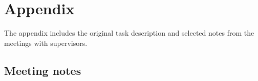 \appendix
\chapter{Appendix}

The appendix includes the original task description and selected notes from the meetings with supervisors.



\label{appendix:task_description}

\section{Meeting notes}
\label{subsection:notes}
